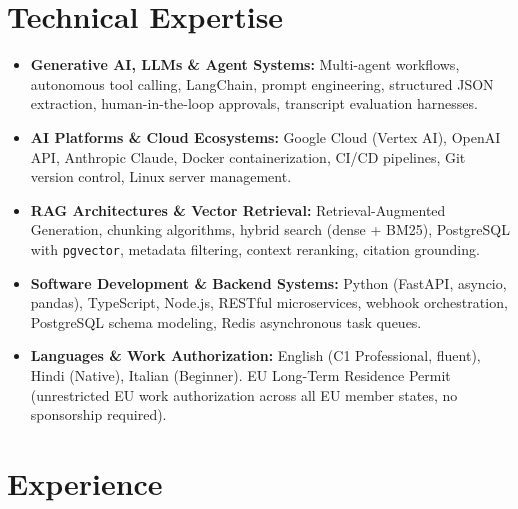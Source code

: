 \documentclass[10pt,a4paper]{article}
\begin{document}
\section{Technical Expertise}
\begin{itemize}
  \item \textbf{Generative AI, LLMs \& Agent Systems:} Multi-agent workflows, autonomous tool calling, LangChain, prompt engineering, structured JSON extraction, human-in-the-loop approvals, transcript evaluation harnesses.
  \item \textbf{AI Platforms \& Cloud Ecosystems:} Google Cloud (Vertex AI), OpenAI API, Anthropic Claude, Docker containerization, CI/CD pipelines, Git version control, Linux server management.
  \item \textbf{RAG Architectures \& Vector Retrieval:} Retrieval-Augmented Generation, chunking algorithms, hybrid search (dense + BM25), PostgreSQL with \texttt{pgvector}, metadata filtering, context reranking, citation grounding.
  \item \textbf{Software Development \& Backend Systems:} Python (FastAPI, asyncio, pandas), TypeScript, Node.js, RESTful microservices, webhook orchestration, PostgreSQL schema modeling, Redis asynchronous task queues.
  \item \textbf{Languages \& Work Authorization:} English (C1 Professional, fluent), Hindi (Native), Italian (Beginner). EU Long-Term Residence Permit (unrestricted EU work authorization across all EU member states, no sponsorship required).
\end{itemize}

\section{Experience}
\end{document}
